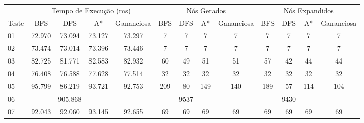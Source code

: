\documentclass[12pt,a4paper]{article}
\begin{document}
\begin{adjustbox}{width={\textwidth}, totalheight={\textheight}, keepaspectratio}
      \begin{tabular}{l cccc cccc cccc}
            \toprule
                  & \multicolumn{4}{c}{Tempo de Execução (ms)} & \multicolumn{4}{c}{Nós Gerados} & \multicolumn{4}{c}{Nós Expandidos}                                                                              \\
            \cmidrule(lr){2-5} \cmidrule(lr){6-9} \cmidrule(lr){10-13}
            Teste & BFS                                        & DFS                             & A*                                 & Gananciosa & BFS & DFS  & A*  & Gananciosa & BFS & DFS  & A*  & Gananciosa \\
            \midrule
            01    & 72.970                                     & 73.094                          & 73.127                             & 73.297     & 7   & 7    & 7   & 7          & 7   & 7    & 7   & 7          \\
            02    & 73.474                                     & 73.014                          & 73.396                             & 73.446     & 7   & 7    & 7   & 7          & 7   & 7    & 7   & 7          \\
            03    & 82.725                                     & 81.771                          & 82.583                             & 82.932     & 60  & 49   & 51  & 51         & 57  & 42   & 44  & 44         \\
            04    & 76.408                                     & 76.588                          & 77.628                             & 77.514     & 32  & 32   & 32  & 32         & 32  & 32   & 32  & 32         \\
            05    & 95.799                                     & 86.219                          & 93.721                             & 92.753     & 209 & 80   & 149 & 140        & 189 & 57   & 114 & 104        \\
            06    & -                                          & 905.868                         & -                                  & -          & -   & 9537 & -   & -          & -   & 9430 & -   & -          \\
            07    & 92.043                                     & 92.060                          & 93.145                             & 92.655     & 69  & 69   & 69  & 69         & 69  & 69   & 69  & 69         \\

\end{tabular}
\end{adjustbox}
\end{document}
